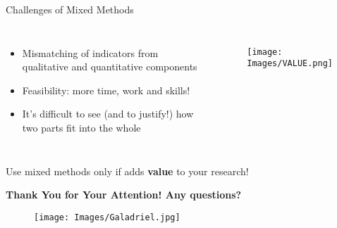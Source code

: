 \documentclass[10pt, aspectratio=169]{beamer}
\begin{document}
\begin{frame}{Challenges of Mixed Methods}
\begin{columns}
\begin{itemize}
    \item Mismatching of indicators from qualitative and quantitative components\vspace{0.3cm}
    \item Feasibility: more time, work and skills!\vspace{0.3cm}
    \item It's difficult to see (and to justify!) how two parts fit into the whole\vspace{0.3cm}
\end{itemize}
\begin{figure}
    \centering
    \texttt{[image: Images/VALUE.png]}
    \label{fig:enter-label}
\end{figure}
\end{columns}
\vspace{0.5cm}
\centering
Use mixed methods only if adds \textbf{value} to your research!
\end{frame}




\begin{frame}[plain]
\centering
\vspace{0.6cm}
\textbf{\large Thank You for Your Attention! Any questions?}
\vspace{0.3cm}
\begin{figure}
    \centering
    \texttt{[image: Images/Galadriel.jpg]}
    \label{fig:enter-label}
\end{figure}
\end{frame}
\end{document}
